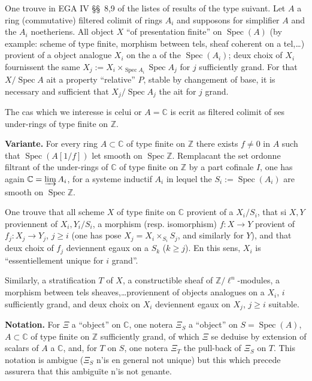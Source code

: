 \documentclass[12pt,a4paper]{article}
\theoremstyle{plain}
\theoremstyle{definition}
\theoremstyle{remark}
\DeclareMathOperator{\Spec}{Spec}
\newcommand{\CC}{\mathbb{C}}
\newcommand{\ZZ}{\mathbb{Z}}
\begin{document}
\subsubsection{}
One trouve in EGA IV \S\S\ 8,9 of the listes of results of the type suivant. Let $A$ a ring (commutative) filtered colimit of rings $A_i$ and supposons for simplifier $A$ and the $A_i$ noetheriens. All object $X$ ``of presentation finite'' on $\Spec(A)$ (by example: scheme of type finite, morphism between tels, sheaf coherent on a tel,\ldots) provient of a object analogue $X_i$ on the a of the $\Spec(A_i)$; deux choix of $X_i$ fournissent the same $X_j := X_i \times_{\Spec A_i} \Spec A_j$ for $j$ sufficiently grand. For that $X/\Spec A$ ait a property ``relative'' $P$, stable by changement of base, it is necessary and sufficient that $X_j/\Spec A_j$ the ait for $j$ grand.

The cas which we interesse is celui or $A = \CC$ is ecrit as filtered colimit of ses under-rings of type finite on $\ZZ$.

\medskip
\noindent\textbf{Variante.} For every ring $A \subset \CC$ of type finite on $\ZZ$ there exists $f \neq 0$ in $A$ such that $\Spec(A[1/f])$ let smooth on $\Spec\ZZ$. Remplacant the set ordonne filtrant of the under-rings of $\CC$ of type finite on $\ZZ$ by a part cofinale $I$, one has again $\CC = \varinjlim A_i$, for a systeme inductif $A_i$ in lequel the $S_i := \Spec(A_i)$ are smooth on $\Spec\ZZ$.

One trouve that all scheme $X$ of type finite on $\CC$ provient of a $X_i/S_i$, that si $X, Y$ proviennent of $X_i, Y_i/S_i$, a morphism (resp. isomorphism) $f: X \to Y$ provient of $f_j: X_j \to Y_j$, $j \geq i$ (one has pose $X_j = X_i \times_{S_i} S_j$, and similarly for $Y$), and that deux choix of $f_j$ deviennent egaux on a $S_k$ ($k \geq j$). En this sens, $X_i$ is ``essentiellement unique for $i$ grand''.

Similarly, a stratification $T$ of $X$, a constructible sheaf of $\ZZ/\ell^n$-modules, a morphism between tels sheaves,\ldots proviennent of objects analogues on a $X_i$, $i$ sufficiently grand, and deux choix on $X_i$ deviennent egaux on $X_j$, $j \geq i$ suitable.

\medskip
\noindent\textbf{Notation.} For $\Xi$ a ``object'' on $\CC$, one notera $\Xi_S$ a ``object'' on $S = \Spec(A)$, $A \subset \CC$ of type finite on $\ZZ$ sufficiently grand, of which $\Xi$ se deduise by extension of scalars of $A$ a $\CC$, and, for $T$ on $S$, one notera $\Xi_T$ the pull-back of $\Xi_S$ on $T$. This notation is ambigue ($\Xi_S$ n'is en general not unique) but this which precede assurera that this ambigu\"ite n'is not genante.
\end{document}
